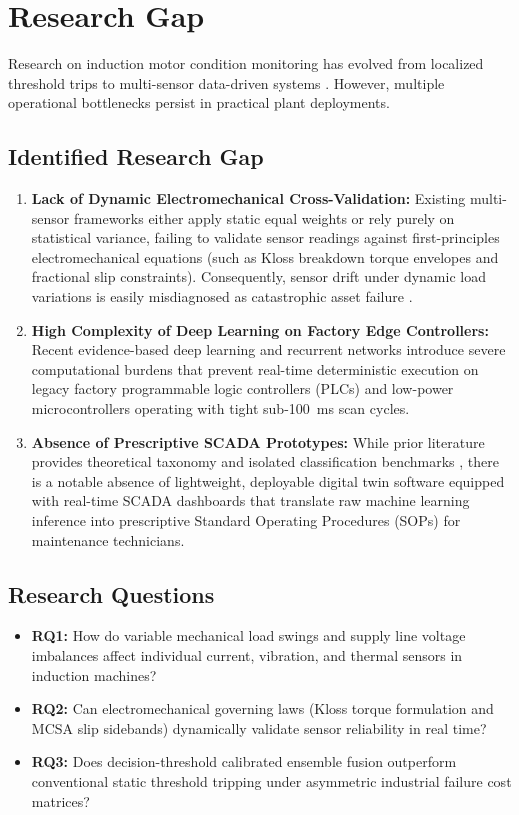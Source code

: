 \documentclass[conference]{IEEEtran}
\begin{document}
\section{Research Gap}
Research on induction motor condition monitoring has evolved from localized threshold trips to multi-sensor data-driven systems \cite{ref6,ref7}. However, multiple operational bottlenecks persist in practical plant deployments.

\subsection{Identified Research Gap}
\begin{enumerate}
    \item \textbf{Lack of Dynamic Electromechanical Cross-Validation:} Existing multi-sensor frameworks \cite{ref4,ref6} either apply static equal weights or rely purely on statistical variance, failing to validate sensor readings against first-principles electromechanical equations (such as Kloss breakdown torque envelopes and fractional slip constraints). Consequently, sensor drift under dynamic load variations is easily misdiagnosed as catastrophic asset failure \cite{ref7}.
    \item \textbf{High Complexity of Deep Learning on Factory Edge Controllers:} Recent evidence-based deep learning and recurrent networks \cite{ref5,ref7} introduce severe computational burdens that prevent real-time deterministic execution on legacy factory programmable logic controllers (PLCs) and low-power microcontrollers operating with tight sub-100~ms scan cycles.
    \item \textbf{Absence of Prescriptive SCADA Prototypes:} While prior literature provides theoretical taxonomy \cite{ref1} and isolated classification benchmarks \cite{ref5}, there is a notable absence of lightweight, deployable digital twin software equipped with real-time SCADA dashboards that translate raw machine learning inference into prescriptive Standard Operating Procedures (SOPs) for maintenance technicians.
\end{enumerate}

\subsection{Research Questions}
\begin{itemize}
    \item \textbf{RQ1:} How do variable mechanical load swings and supply line voltage imbalances affect individual current, vibration, and thermal sensors in induction machines?
    \item \textbf{RQ2:} Can electromechanical governing laws (Kloss torque formulation and MCSA slip sidebands) dynamically validate sensor reliability in real time?
    \item \textbf{RQ3:} Does decision-threshold calibrated ensemble fusion outperform conventional static threshold tripping under asymmetric industrial failure cost matrices?
\end{itemize}
\end{document}
